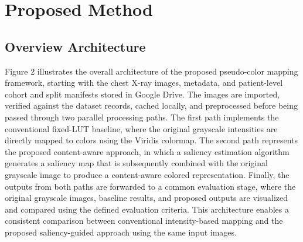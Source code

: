 \documentclass[11pt]{article}
\begin{document}
\section{Proposed Method}
\label{sec:method}

\subsection{Overview Architecture}

Figure 2 illustrates the overall architecture of the proposed pseudo-color mapping framework, starting with the chest X-ray images, metadata, and patient-level cohort and split manifests stored in Google Drive. The images are imported, verified against the dataset records, cached locally, and preprocessed before being passed through two parallel processing paths. The first path implements the conventional fixed-LUT baseline, where the original grayscale intensities are directly mapped to colors using the Viridis colormap. The second path represents the proposed content-aware approach, in which a saliency estimation algorithm generates a saliency map that is subsequently combined with the original grayscale image to produce a content-aware colored representation. Finally, the outputs from both paths are forwarded to a common evaluation stage, where the original grayscale images, baseline results, and proposed outputs are visualized and compared using the defined evaluation criteria. This architecture enables a consistent comparison between conventional intensity-based mapping and the proposed saliency-guided approach using the same input images.
\end{document}
